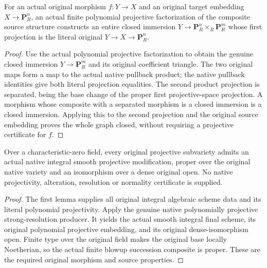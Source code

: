 \begin{lemma}
\label{lem:fc-original-projective-product-graph}

For an actual original morphism $f:Y\to X$ and an original target embedding
$X\to\mathbf P^n_R$, an actual finite polynomial projective factorization
of the composite source structure constructs an entire closed immersion
$Y\to\mathbf P^n_R\times_R\mathbf P^m_R$ whose first projection is the
literal original $Y\to X\to\mathbf P^n_R$.
\end{lemma}
\begin{proof}
Use the actual polynomial projective factorization to obtain the genuine
closed immersion $Y\to\mathbf P^m_R$ and its original coefficient triangle.
The two original maps form a map to the actual native pullback product;
the native pullback identities give both literal projection equalities.
The second product projection is separated, being the base change of the
proper first projective-space projection.  A morphism whose composite with
a separated morphism is a closed immersion is a closed immersion.  Applying
this to the second projection and the original source embedding proves
the whole graph closed, without requiring a projective certificate for $f$.
\end{proof}

\begin{theorem}
\label{thm:fc-original-projective-variety-native-resolution}
\leanok
{}
Over a characteristic-zero field, every original projective subvariety
admits an actual native integral smooth projective modification, proper
over the original native variety and an isomorphism over a dense original open.
No native projectivity, alteration, resolution or normality certificate is supplied.
\end{theorem}
\begin{proof}
The first lemma supplies all original integral algebraic scheme data and
its literal polynomial projectivity.  Apply the genuine native polynomially
projective strong-resolution producer.  It yields the actual smooth integral
final scheme, its original polynomial projective embedding, and its original
dense-isomorphism open.  Finite type over the original field makes the original
base locally Noetherian, so the actual finite blowup succession composite is
proper.  These are the required original morphism and source properties.
\end{proof}

